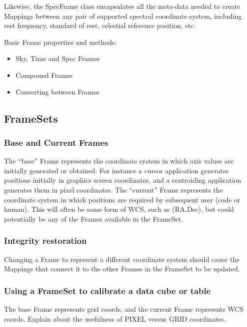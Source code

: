 \documentclass[final,authoryear,5p,times,twocolumn]{elsarticle}
\begin{document}
Likewise, the SpecFrame class encapsulates all the meta-data needed to
create Mappings between any pair of supported spectral coordinate system,
including rest frequency, standard of rest, celestial reference position,
etc.

Basic Frame properties and methods:

\begin{itemize}
\item Sky, Time and Spec Frames
\item Compound Frames
\item Converting between Frames
\end{itemize}

\subsection{FrameSets}

\subsubsection{Base and Current Frames}

The ``base'' Frame represents the coordinate system in which axis values
are initially generated or obtained. For instance a cursor application
generates positions initially in graphics screen coordinates, and a
centroiding application generates them in pixel coordinates.  The
``current'' Frame represents the coordinate system in which positions
are required by subsequent user (code or human). This will often be
some form of WCS, such as (RA,Dec), but could potentially be any of
the Frames available in the FrameSet.

\subsubsection{Integrity restoration}

Changing a Frame to represent a different coordinate system should
cause the Mappings that connect it to the other Frames in the FrameSet
to be updated.

\subsubsection{Using a FrameSet to calibrate a data cube or table}

The base Frame represents grid coords, and the current Frame
represents WCS coords.  Explain about the usefulness of PIXEL versus
GRID coordinates.
\end{document}
